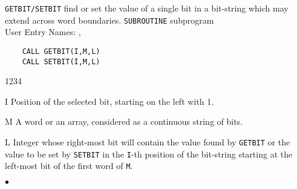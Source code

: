                              
                           
                            
{\tt GETBIT/SETBIT} find or set the value of a single bit in a bit-string
which may extend across word boundaries.
\Structure
{\tt SUBROUTINE} subprogram \\
User Entry Names: , 
\Usage
\begin{verbatim}
    CALL GETBIT(I,M,L)
    CALL SETBIT(I,M,L)
\end{verbatim}
\begin{DLtt}{1234}
\item [I] Position of the selected bit, starting on the left with 1.
\item [M] A word or an array, considered as a continuous string of bits.
\item [L] Integer whose right-most bit will contain the value found
by {\tt GETBIT} or the value to be set by {\tt SETBIT} in the
{\tt I}-th position of the bit-string starting at the left-most bit of
the first word of {\tt M}.
\end{DLtt}
$\bullet$
